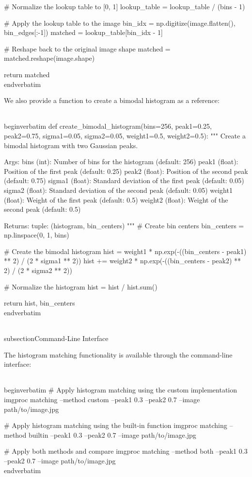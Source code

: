     # Normalize the lookup table to [0, 1]
    lookup_table = lookup_table / (bins - 1)
    
    # Apply the lookup table to the image
    bin_idx = np.digitize(image.flatten(), bin_edges[:-1])
    matched = lookup_table[bin_idx - 1]
    
    # Reshape back to the original image shape
    matched = matched.reshape(image.shape)
    
    return matched
\\end{verbatim}

We also provide a function to create a bimodal histogram as a reference:

\\begin{verbatim}
def create_bimodal_histogram(bins=256, peak1=0.25, peak2=0.75, 
                            sigma1=0.05, sigma2=0.05, 
                            weight1=0.5, weight2=0.5):
    """
    Create a bimodal histogram with two Gaussian peaks.
    
    Args:
        bins (int): Number of bins for the histogram (default: 256)
        peak1 (float): Position of the first peak (default: 0.25)
        peak2 (float): Position of the second peak (default: 0.75)
        sigma1 (float): Standard deviation of the first peak (default: 0.05)
        sigma2 (float): Standard deviation of the second peak (default: 0.05)
        weight1 (float): Weight of the first peak (default: 0.5)
        weight2 (float): Weight of the second peak (default: 0.5)
        
    Returns:
        tuple: (histogram, bin_centers)
    """
    # Create bin centers
    bin_centers = np.linspace(0, 1, bins)
    
    # Create the bimodal histogram
    hist = weight1 * np.exp(-((bin_centers - peak1) ** 2) / (2 * sigma1 ** 2))
    hist += weight2 * np.exp(-((bin_centers - peak2) ** 2) / (2 * sigma2 ** 2))
    
    # Normalize the histogram
    hist = hist / hist.sum()
    
    return hist, bin_centers
\\end{verbatim}

\\subsection{Command-Line Interface}

The histogram matching functionality is available through the command-line interface:

\\begin{verbatim}
# Apply histogram matching using the custom implementation
imgproc matching --method custom --peak1 0.3 --peak2 0.7 --image path/to/image.jpg

# Apply histogram matching using the built-in function
imgproc matching --method builtin --peak1 0.3 --peak2 0.7 --image path/to/image.jpg

# Apply both methods and compare
imgproc matching --method both --peak1 0.3 --peak2 0.7 --image path/to/image.jpg
\\end{verbatim}
